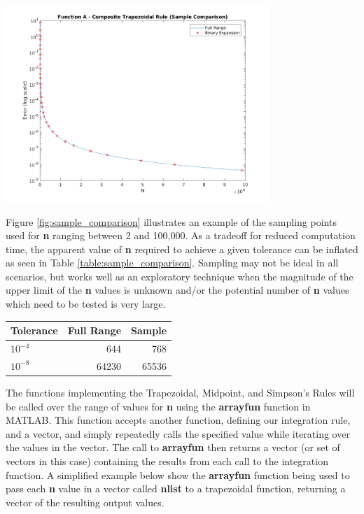 \documentclass{article}
\begin{document}
\begin{center}
	\includegraphics[width=0.75\textwidth]{../output/a_trapezoidal_sample_comparison.png}
	\label{fig:sample_comparison}
\end{center}

Figure \ref{fig:sample_comparison} illustrates an example of the sampling points used for \textbf{n} ranging between 2 and 100,000. As a tradeoff for reduced computation time, the apparent value of \textbf{n} required to achieve a given tolerance can be inflated as seen in Table \ref{table:sample_comparison}. Sampling may not be ideal in all scenarios, but works well as an exploratory technique when the magnitude of the upper limit of the \textbf{n} values is unknown and/or the potential number of \textbf{n} values which need to be tested is very large.

\bgroup
\def\arraystretch{1.5}
\begin{center}
	\centering
	\begin{tabular}{l|r|r}
	\textbf{Tolerance} & \textbf{Full Range} & \textbf{Sample} \\
	\hline
	$10^{-4}$ & 644 & 768\\
	$10^{-8}$ & 64230 & 65536
	\end{tabular}
	\label{table:sample_comparison}
\end{center}
\egroup


The functions implementing the Trapezoidal, Midpoint, and Simpson's Rules will be called over the range of values for \textbf{n} using the \textbf{arrayfun} function in MATLAB. This function accepts another function, defining our integration rule, and a vector, and simply repeatedly calls the specified value while iterating over the values in the vector. The call to \textbf{arrayfun} then returns a vector (or set of vectors in this case) containing the results from each call to the integration function. A simplified example below show the \textbf{arrayfun} function being used to pass each \textbf{n} value in a vector called \textbf{nlist} to a trapezoidal function, returning a vector of the resulting output values.
\end{document}
